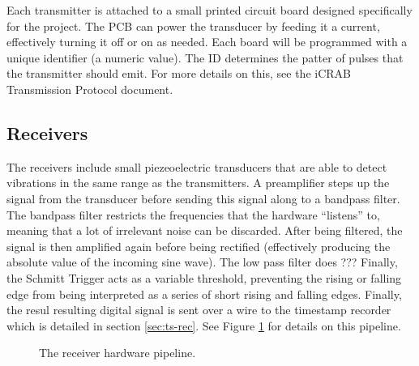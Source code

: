 \documentclass[12pt]{article}
\begin{document}
Each transmitter is attached to a small printed circuit board designed
specifically for the project.
The PCB can power the transducer by feeding it a current, effectively turning
it off or on as needed.
Each board will be programmed with a unique identifier (a numeric value).
The ID determines the patter of pulses that the transmitter should emit.
For more details on this, see the iCRAB Transmission Protocol document.

\subsection{Receivers}

The receivers include small piezeoelectric transducers that are able to detect
vibrations in the same range as the transmitters.
A preamplifier steps up the signal from the transducer before sending this
signal along to a bandpass filter.
The bandpass filter restricts the frequencies that the hardware ``listens''
to, meaning that a lot of irrelevant noise can be discarded.
After being filtered, the signal is then amplified again before being
rectified (effectively producing the absolute value of the incoming sine wave).
The low pass filter does ???
Finally, the Schmitt Trigger acts as a variable threshold, preventing the
rising or falling edge from being interpreted as a series of short rising and
falling edges.
Finally, the resul resulting digital signal is sent over a wire to the timestamp
recorder which is detailed in section \ref{sec:ts-rec}.
See Figure \ref{fig:rx-detail} for details on this pipeline.

\begin{figure}[h]
\begin{center}
\end{center}
\caption{The receiver hardware pipeline.}
\label{fig:rx-detail}
\end{figure}
\end{document}
